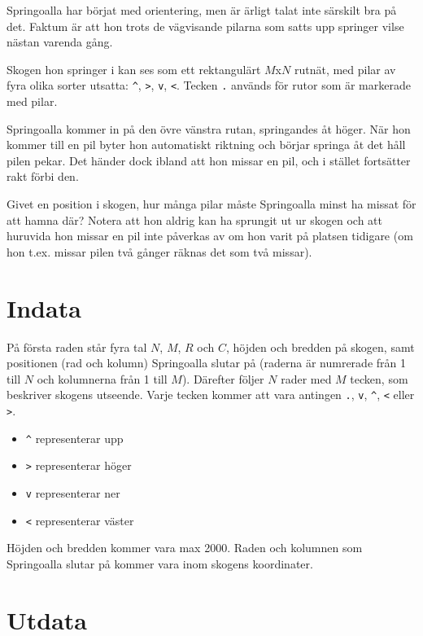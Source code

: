 
Springoalla har börjat med orientering, men är ärligt talat inte
särskilt bra på det. Faktum är att hon trots de vägvisande pilarna
som satts upp springer vilse nästan varenda gång.

Skogen hon springer i kan ses som ett rektangulärt $M$x$N$ rutnät, med
pilar av fyra olika sorter utsatta: \texttt{\^}, \texttt{>}, \texttt{v},
\texttt{<}. Tecken \texttt{.} används för rutor som är markerade med pilar.

Springoalla kommer in på den övre vänstra rutan, springandes åt
höger. När hon kommer till en pil byter hon automatiskt riktning och
börjar springa åt det håll pilen pekar. Det händer dock ibland att
hon missar en pil, och i stället fortsätter rakt förbi den.

Givet en position i skogen, hur många pilar måste Springoalla minst ha missat för att hamna där? Notera att hon aldrig kan ha sprungit ut ur skogen och att huruvida hon missar en pil inte påverkas av om hon varit på platsen tidigare (om hon t.ex. missar pilen två gånger räknas det som två missar).

\section*{Indata}

På första raden står fyra tal $N$, $M$, $R$ och $C$, höjden och bredden på
skogen, samt positionen (rad och kolumn) Springoalla slutar på (raderna
är numrerade från 1 till $N$ och kolumnerna från 1 till $M$). Därefter
följer $N$ rader med $M$ tecken, som beskriver skogens utseende. Varje
tecken kommer att vara antingen \texttt{.}, \texttt{v}, \texttt{\^}, \texttt{<} eller \texttt{>}.

\begin{itemize}
\item \texttt{\^} representerar upp
\item \texttt{>} representerar höger
\item \texttt{v} representerar ner
\item \texttt{<} representerar väster
\end{itemize}

Höjden och bredden kommer vara max 2000. Raden och kolumnen som
Springoalla slutar på kommer vara inom skogens koordinater.

\section*{Utdata}

